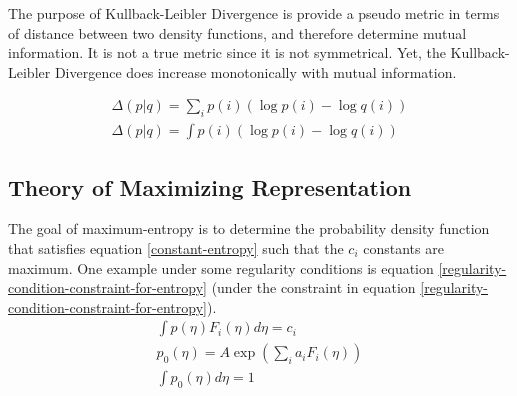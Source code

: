 \documentclass[11pt]{article}
\begin{document}

The purpose of Kullback-Leibler Divergence is provide a pseudo metric in terms of distance  between two density functions, and therefore determine mutual information.   It is not a true metric since it is not symmetrical.   Yet, the Kullback-Leibler Divergence does increase monotonically with mutual information.  

\begin{eqnarray}
\Delta(p| q) = \sum _i p(i) (\log p(i) - \log q(i)) \\
\Delta(p| q) = \int p(i) (\log p(i) - \log q(i)) 
\end{eqnarray}


\subsection{Theory of Maximizing Representation}\label{maximizing-represnetation}

The goal of maximum-entropy is to determine the probability density function that satisfies equation \ref{constant-entropy} such that the $c_i$ constants are maximum.  One example under some regularity conditions is equation \ref{regularity-condition-constraint-for-entropy} (under the constraint in equation \ref{regularity-condition-constraint-for-entropy}).
\begin{eqnarray}
\int p(\eta) F_i (\eta) d\eta =  c_i \label{constant-entropy} \\
p_0( \eta) = A \exp (\sum_i a_i F_i (\eta)) \label{regularity-condition-constraint-for-entropy} \\
\int p_0 (\eta) d \eta = 1 \label{system-regularity-condition-constraint-for-entropy} 
\end{eqnarray}
\end{document}
